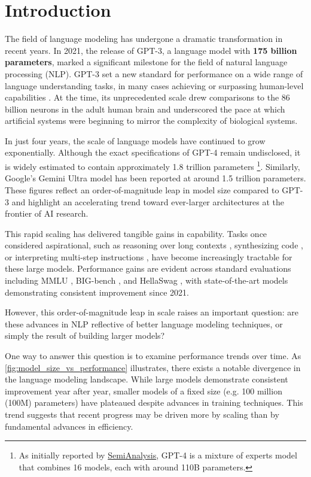 \chapter{Introduction}

The field of language modeling has undergone a dramatic transformation in recent years. In 2021, the release of GPT-3, a language model with \textbf{175 billion parameters}, marked a significant milestone for the field of natural language processing (NLP). GPT-3 set a new standard for performance on a wide range of language understanding tasks, in many cases achieving or surpassing human-level capabilities \citep{brown2020gpt3}. At the time, its unprecedented scale drew comparisons to the 86 billion neurons in the adult human brain \citep{azevedo2009neurons} and underscored the pace at which artificial systems were beginning to mirror the complexity of biological systems.

In just four years, the scale of language models have continued to grow exponentially. Although the exact specifications of GPT-4 remain undisclosed, it is widely estimated to contain approximately 1.8 trillion parameters \footnote{As initially reported by \href{https://semianalysis.com/2023/07/10/gpt-4-architecture-infrastructure/}{SemiAnalysis}, GPT-4 is a mixture of experts model that combines 16 models, each with around 110B parameters.}. Similarly, Google's Gemini Ultra model has been reported at around 1.5 trillion parameters. These figures reflect an order-of-magnitude leap in model size compared to GPT-3 and highlight an accelerating trend toward ever-larger architectures at the frontier of AI research.

This rapid scaling has delivered tangible gains in capability. Tasks once considered aspirational, such as reasoning over long contexts \citep{lewis2020retrieval}, synthesizing code \citep{chen2021evaluating}, or interpreting multi-step instructions \citep{wei2022chain}, have become increasingly tractable for these large models. Performance gains are evident across standard evaluations including MMLU \citep{hendrycks2021mmlu}, BIG-bench \citep{srivastava2023bigbench}, and HellaSwag \citep{zellers2019hellaswag}, with state-of-the-art models demonstrating consistent improvement since 2021.

However, this order-of-magnitude leap in scale raises an important question: are these advances in NLP reflective of better language modeling techniques, or simply the result of building larger models? 

One way to answer this question is to examine performance trends over time. As \cref{fig:model_size_vs_performance} illustrates, there exists a notable divergence in the language modeling landscape. While large models demonstrate consistent improvement year after year, smaller models of a fixed size (e.g. 100 million (100M) parameters) have plateaued despite advances in training techniques. This trend suggests that recent progress may be driven more by scaling than by fundamental advances in efficiency.

